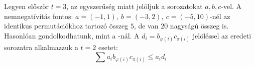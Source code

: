 Legyen először $t=3$, az egyszerűség miatt jelöljuk a sorozatokat $a,b,c$-vel.
A nemnegatívitás fontos: $a=(-1,1),\ b=(-3,2),\ c=(-5,10)$-nél az 
identikus permutációkhoz tartozó összeg $5$, de van $20$ nagyságú összeg is. 
Hasonlóan gondolkodhatunk, mint a -nál. A 
$d_{i}=b_{\varphi(i)}c_{\pi(i)}$ jelöléssel az eredeti sorozatra alkalmazzuk a $t=2$ esetet:
$$
\sum a_{i}b_{\varphi(i)}c_{\pi(i)} \le a_{i}d_{i}
$$

